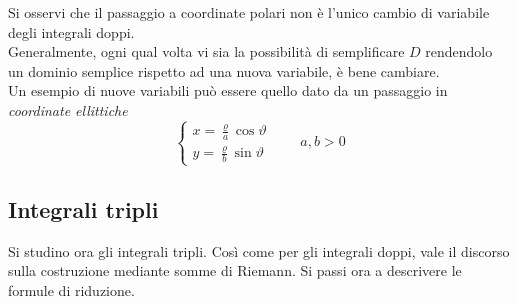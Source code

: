 \vspace*{6pt}
\begin{oss}
    Si osservi che il passaggio a coordinate polari non è l'unico cambio di variabile degli integrali doppi.\\
    Generalmente, ogni qual volta vi sia la possibilità di semplificare $D$ rendendolo un dominio semplice rispetto ad una nuova variabile, è bene cambiare.\\ 
    Un esempio di nuove variabili può essere quello dato da un passaggio in \textit{coordinate ellittiche}
    \begin{equation}
        \begin{cases}
            x=\frac{\varrho}{a} \cos \vartheta\\
            y=\frac{\varrho}{b}\sin\vartheta
        \end{cases} \qquad a,b >0
    \end{equation}
\end{oss}
\subsection{Integrali tripli}
Si studino ora gli integrali tripli. Così come per gli integrali doppi, vale il discorso sulla costruzione mediante somme di Riemann. 
Si passi ora a descrivere le formule di riduzione.
